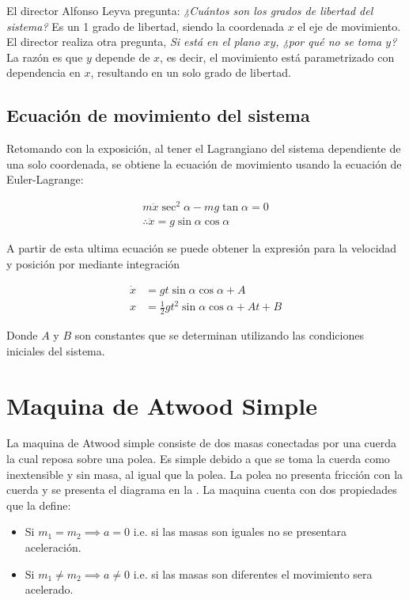 \documentclass{article}
\theoremstyle{definition}
\begin{document}
	El director Alfonso Leyva pregunta: \emph{¿Cuántos son los grados de libertad del sistema?} Es un 1 grado de libertad, siendo la coordenada $x$ el eje de movimiento. El director realiza otra pregunta, \emph{Si está en el plano $xy$, ¿por qué no se toma $y$?} La razón es que $y$ depende de $x$, es decir, el movimiento está parametrizado con dependencia en $x$, resultando en un solo grado de libertad.

\subsection{Ecuación de movimiento del sistema}
Retomando con la exposición, al tener el Lagrangiano del sistema dependiente de una solo coordenada, se obtiene la ecuación de movimiento usando la ecuación de Euler-Lagrange:

\begin{gather}
	m\ddot{x}\sec^2{\alpha} - mg\tan{\alpha} = 0 \\
	\therefore \ddot{x} = g\sin{\alpha}\cos{\alpha}
\end{gather}

A partir de esta ultima ecuación se puede obtener la expresión para la velocidad y posición por mediante integración

\begin{align}
	\dot{x} &= gt\sin{\alpha}\cos{\alpha} + A \\
	x       &= \frac{1}{2} gt^{2} \sin{\alpha}\cos{\alpha} + At + B
\end{align}

Donde $A$ y $B$ son constantes que se determinan utilizando las condiciones iniciales del sistema.

\section{Maquina de Atwood Simple}
La maquina de Atwood simple consiste de dos masas conectadas por una cuerda la cual reposa sobre una polea. Es simple debido a que se toma la cuerda como inextensible y sin masa, al igual que la polea. La polea no presenta fricción con la cuerda y se presenta el diagrama en la . La maquina cuenta con dos propiedades que la define:

\begin{itemize}
	\item Si $m_1 = m_2 \implies a = 0$ i.e. si las masas son iguales no se presentara aceleración.
	\item Si $m_1 \ne m_2 \implies a \ne 0$ i.e. si las masas son diferentes el movimiento sera acelerado.
\end{itemize}
\end{document}
